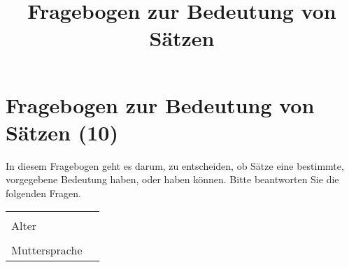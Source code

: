 \documentclass[a4paper, 8pt]{article}
\title{Fragebogen zur Bedeutung von Sätzen}
\begin{document}
\section*{Fragebogen zur Bedeutung von Sätzen (10)}

In diesem Fragebogen geht es darum, zu entscheiden, ob Sätze eine bestimmte, vorgegebene Bedeutung haben, oder haben können. Bitte beantworten Sie die folgenden Fragen.


\begin{tabular}{|l|p{5cm}|}
\hline
& \\
Alter & \\
\hline
& \\
Muttersprache & \\
\hline
\end{tabular}
\end{document}
